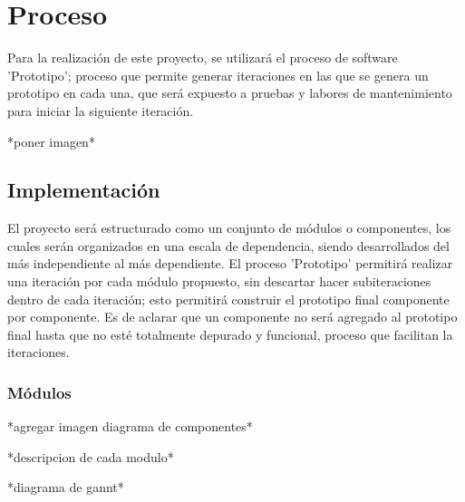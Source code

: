 \chapter{Proceso}

Para la realización de este proyecto, se utilizará el proceso de software 'Prototipo'; proceso que permite generar iteraciones en las que se genera un prototipo en cada una, que será expuesto a pruebas y labores de mantenimiento para iniciar la siguiente iteración.

*poner imagen*

\section{Implementación}

El proyecto será estructurado como un conjunto de módulos o componentes, los cuales serán organizados en una escala de dependencia, siendo desarrollados del más independiente al más dependiente. El proceso 'Prototipo' permitirá realizar una iteración por cada módulo propuesto, sin descartar hacer subiteraciones dentro de cada iteración; esto permitirá construir el prototipo final componente por componente. Es de aclarar que un componente no será agregado al prototipo final hasta que no esté totalmente depurado y funcional, proceso que facilitan la iteraciones.


\subsection{Módulos}

*agregar imagen diagrama de componentes*

*descripcion de cada modulo*

*diagrama de gannt*